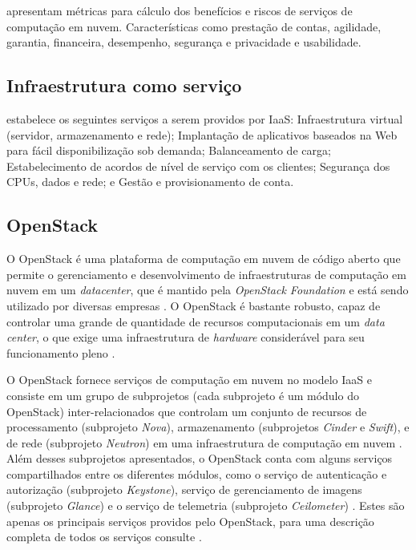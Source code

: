 \documentclass[conference]{IEEEtran}
\begin{document}
 apresentam métricas para cálculo dos benefícios e riscos
de serviços de computação em nuvem. Características como prestação de contas, agilidade,
garantia, financeira, desempenho, segurança e privacidade e usabilidade. 






\subsection{Infraestrutura como serviço}

 estabelece os seguintes serviços a serem providos 
por IaaS: Infraestrutura virtual (servidor, armazenamento e rede);
Implantação de aplicativos baseados na Web para fácil disponibilização sob demanda; Balanceamento de carga; 
Estabelecimento de acordos de nível de serviço com os clientes;  Segurança dos CPUs, dados e rede;
e Gestão e provisionamento de conta.

\subsection{OpenStack}

O OpenStack \cite{openstack_general} é uma plataforma de computação em nuvem de código aberto que permite o gerenciamento e desenvolvimento 
de infraestruturas de computação em nuvem em um \textit{datacenter}, que é mantido pela 
\textit{OpenStack Foundation} e está sendo utilizado por diversas empresas \cite{openstack} \cite{bui2016}.
O OpenStack é bastante robusto, capaz de controlar uma grande de quantidade
de recursos computacionais em um \textit{data center}, o que exige uma infraestrutura de \textit{hardware} 
considerável para seu funcionamento pleno \cite{openstack_general} \cite{openstack}.

O OpenStack fornece serviços de computação em nuvem no modelo IaaS e consiste em um grupo de subprojetos (cada subprojeto é um módulo 
do OpenStack) inter-relacionados 
que controlam um conjunto de recursos de processamento (subprojeto \textit{Nova}), armazenamento (subprojetos \textit{Cinder} e \textit{Swift}),
e de rede (subprojeto \textit{Neutron}) em uma infraestrutura de computação em nuvem \cite{openstack} \cite{bui2016}.
Além desses subprojetos apresentados, o OpenStack conta com alguns serviços compartilhados entre os diferentes módulos, como o serviço de 
autenticação e autorização (subprojeto \textit{Keystone}), serviço de gerenciamento de imagens (subprojeto \textit{Glance}) e o serviço de 
telemetria (subprojeto \textit{Ceilometer}) \cite{openstack}. Estes são apenas os principais serviços providos pelo OpenStack, para uma
descrição completa de todos os serviços consulte \cite{openstack}.
\end{document}
